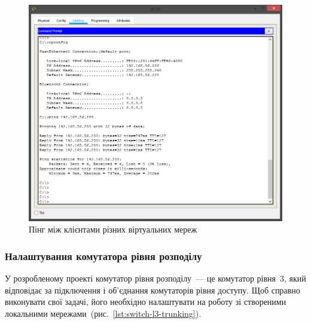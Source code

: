 \documentclass[
  ukrainian,
  simple,
  floatsection,
]{eskdnaukvd}
\newlength{\gridunitwidth}
\begin{document}
      \begin{figure}[!htbp]
        \centering
        \includegraphics[width = 6 \gridunitwidth]{./assets/09-intervlan-ping.png}
        \caption{Пінг між клієнтами різних віртуальних мереж}
        \label{fig:intervlan-ping}
      \end{figure}


    \subsubsection{Налаштування комутатора рівня розподілу}
      У розробленому проекті комутатор рівня розподілу~— це комутатор рівня~3, який відповідає за підключення і об'єднання комутаторів рівня доступу. Щоб справно виконувати свої задачі, його необхідно налаштувати на роботу зі створеними локальними мережами~(рис.~\ref{lst:switch-l3-trunking}).
\end{document}
